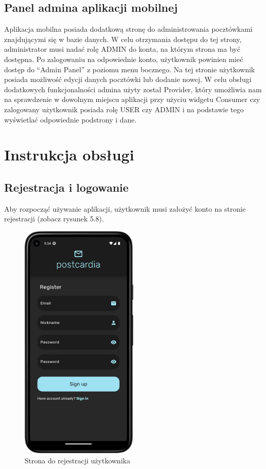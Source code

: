 \documentclass[a4paper,twoside,12pt]{book}
\begin{document}
\subsection{Panel admina aplikacji mobilnej}

Aplikacja mobilna posiada dodatkową stronę do administrowania pocztówkami znajdującymi się w bazie danych. W celu otrzymania dostępu do tej strony, administrator musi nadać rolę ADMIN do konta, na którym strona ma być dostępna. Po zalogowaniu na odpowiednie konto, użytkownik powinien mieć dostęp do ``Admin Panel'' z poziomu menu bocznego. 
Na tej stronie użytkownik posiada możliwość edycji danych pocztówki lub dodanie nowej. W celu obsługi dodatkowych funkcjonalności admina użyty został Provider, który umożliwia nam na sprawdzenie w dowolnym miejscu aplikacji przy użyciu widgetu Consumer czy zalogowany użytkownik posiada rolę USER czy ADMIN i na podstawie tego wyświetlać odpowiednie podstrony i dane.

\section{Instrukcja obsługi}

\subsection{Rejestracja i logowanie}
Aby rozpocząć używanie aplikacji, użytkownik musi założyć konto na stronie rejestracji (zobacz rysunek 5.8).
\begin{figure}[H]
    \centering
    \includegraphics[width=0.5\textwidth]{mobile_ss/rejestracja.png}
    \caption{Strona do rejestracji użytkownika}
\end{figure}
\end{document}
